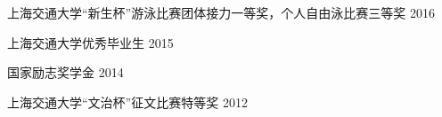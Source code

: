 



\begin{cvhonors}

\hspace{-25pt}
  \cvhonor
    {} %
    {上海交通大学“新生杯”游泳比赛团体接力一等奖，个人自由泳比赛三等奖} %
    {} %
    {2016} %

\hspace{-25pt}
  \cvhonor
    {} %
    {上海交通大学优秀毕业生} %
    {} %
    {2015} %

\hspace{-25pt}
  \cvhonor
    {} %
    {国家励志奖学金} %
    {} %
    {2014} %

\hspace{-25pt}
  \cvhonor
    {} %
    {上海交通大学“文治杯”征文比赛特等奖} %
    {} %
    {2012} %

\end{cvhonors}


%
%
%
%

